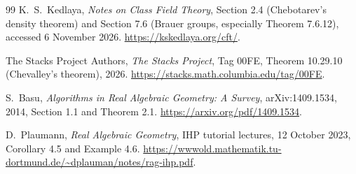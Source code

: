 \documentclass[11pt]{article}
\theoremstyle{definition}
\begin{document}
\begin{thebibliography}{99}
K.~S.~Kedlaya, \emph{Notes on Class Field Theory},
Section 2.4 (Chebotarev's density theorem) and Section 7.6
(Brauer groups, especially Theorem 7.6.12), accessed
6 November 2026.
\url{https://kskedlaya.org/cft/}.

The Stacks Project Authors, \emph{The Stacks Project},
Tag 00FE, Theorem 10.29.10 (Chevalley's theorem), 2026.
\url{https://stacks.math.columbia.edu/tag/00FE}.

S.~Basu, \emph{Algorithms in Real Algebraic Geometry:
A Survey}, arXiv:1409.1534, 2014, Section 1.1 and Theorem 2.1.
\url{https://arxiv.org/pdf/1409.1534}.

D.~Plaumann, \emph{Real Algebraic Geometry},
IHP tutorial lectures, 12 October 2023,
Corollary 4.5 and Example 4.6.
\url{https://wwwold.mathematik.tu-dortmund.de/~dplauman/notes/rag-ihp.pdf}.


\end{thebibliography}
\end{document}

